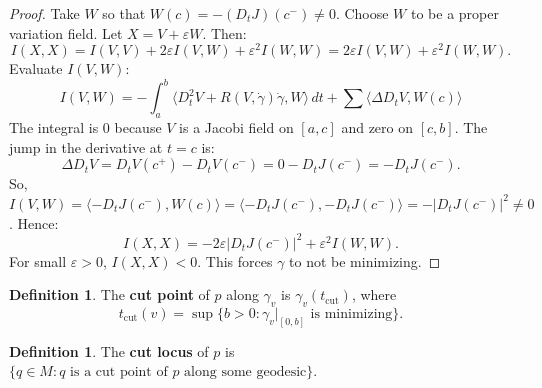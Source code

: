 \documentclass[11pt, a4paper]{article}
\theoremstyle{plain}
\theoremstyle{definition}
\newtheorem{definition}[theorem]{Definition}
\theoremstyle{remark}
\begin{document}
{\begin{proof}
Take $W$ so that $W(c) = -(D_t J)(c^-) \neq 0$. Choose $W$ to be a proper variation field. Let $X = V + \varepsilon W$. Then:
\[
I(X, X) = I(V, V) + 2\varepsilon I(V, W) + \varepsilon^2 I(W, W) = 2\varepsilon I(V, W) + \varepsilon^2 I(W, W).
\]
Evaluate $I(V, W)$:
\[
I(V, W) = -\int_a^b \langle D_t^2 V + R(V, \dot{\gamma})\dot{\gamma}, W \rangle \, dt + \sum \langle \Delta D_t V, W(c) \rangle
\]
The integral is $0$ because $V$ is a Jacobi field on $[a,c]$ and zero on $[c,b]$. The jump in the derivative at $t=c$ is:
\[
\Delta D_t V = D_t V(c^+) - D_t V(c^-) = 0 - D_t J(c^-) = -D_t J(c^-).
\]
So, $I(V, W) = \langle -D_t J(c^-), W(c) \rangle = \langle -D_t J(c^-), -D_t J(c^-) \rangle = -|D_t J(c^-)|^2 \neq 0$.
Hence:
\[
I(X, X) = -2\varepsilon |D_t J(c^-)|^2 + \varepsilon^2 I(W, W).
\]
For small $\varepsilon > 0$, $I(X, X) < 0$. This forces $\gamma$ to not be minimizing.
\end{proof}

\begin{definition}
The \textbf{cut point} of $p$ along $\gamma_v$ is $\gamma_v(t_{\text{cut}})$, where
\[
t_{\text{cut}}(v) = \sup \{ b > 0 : \gamma_v|_{[0, b]} \text{ is minimizing} \}.
\]
\end{definition}

\begin{definition}
The \textbf{cut locus} of $p$ is $\{ q \in M : q \text{ is a cut point of } p \text{ along some geodesic} \}$.
\end{definition}
}
\newpage
\end{document}

